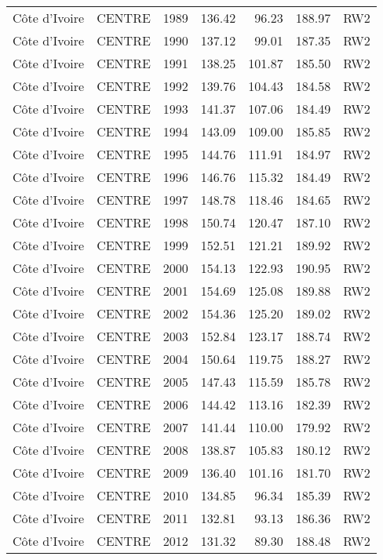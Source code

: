 \begin{longtable}{lllrrrl}
  C\^{o}te d'Ivoire & CENTRE & 1989 & 136.42 & 96.23 & 188.97 & RW2 \\ 
  C\^{o}te d'Ivoire & CENTRE & 1990 & 137.12 & 99.01 & 187.35 & RW2 \\ 
  C\^{o}te d'Ivoire & CENTRE & 1991 & 138.25 & 101.87 & 185.50 & RW2 \\ 
  C\^{o}te d'Ivoire & CENTRE & 1992 & 139.76 & 104.43 & 184.58 & RW2 \\ 
  C\^{o}te d'Ivoire & CENTRE & 1993 & 141.37 & 107.06 & 184.49 & RW2 \\ 
  C\^{o}te d'Ivoire & CENTRE & 1994 & 143.09 & 109.00 & 185.85 & RW2 \\ 
  C\^{o}te d'Ivoire & CENTRE & 1995 & 144.76 & 111.91 & 184.97 & RW2 \\ 
  C\^{o}te d'Ivoire & CENTRE & 1996 & 146.76 & 115.32 & 184.49 & RW2 \\ 
  C\^{o}te d'Ivoire & CENTRE & 1997 & 148.78 & 118.46 & 184.65 & RW2 \\ 
  C\^{o}te d'Ivoire & CENTRE & 1998 & 150.74 & 120.47 & 187.10 & RW2 \\ 
  C\^{o}te d'Ivoire & CENTRE & 1999 & 152.51 & 121.21 & 189.92 & RW2 \\ 
  C\^{o}te d'Ivoire & CENTRE & 2000 & 154.13 & 122.93 & 190.95 & RW2 \\ 
  C\^{o}te d'Ivoire & CENTRE & 2001 & 154.69 & 125.08 & 189.88 & RW2 \\ 
  C\^{o}te d'Ivoire & CENTRE & 2002 & 154.36 & 125.20 & 189.02 & RW2 \\ 
  C\^{o}te d'Ivoire & CENTRE & 2003 & 152.84 & 123.17 & 188.74 & RW2 \\ 
  C\^{o}te d'Ivoire & CENTRE & 2004 & 150.64 & 119.75 & 188.27 & RW2 \\ 
  C\^{o}te d'Ivoire & CENTRE & 2005 & 147.43 & 115.59 & 185.78 & RW2 \\ 
  C\^{o}te d'Ivoire & CENTRE & 2006 & 144.42 & 113.16 & 182.39 & RW2 \\ 
  C\^{o}te d'Ivoire & CENTRE & 2007 & 141.44 & 110.00 & 179.92 & RW2 \\ 
  C\^{o}te d'Ivoire & CENTRE & 2008 & 138.87 & 105.83 & 180.12 & RW2 \\ 
  C\^{o}te d'Ivoire & CENTRE & 2009 & 136.40 & 101.16 & 181.70 & RW2 \\ 
  C\^{o}te d'Ivoire & CENTRE & 2010 & 134.85 & 96.34 & 185.39 & RW2 \\ 
  C\^{o}te d'Ivoire & CENTRE & 2011 & 132.81 & 93.13 & 186.36 & RW2 \\ 
  C\^{o}te d'Ivoire & CENTRE & 2012 & 131.32 & 89.30 & 188.48 & RW2 \\ 

\end{longtable}
